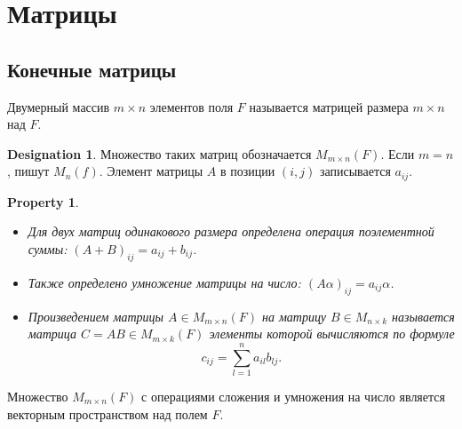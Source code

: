 \documentclass[11pt]{book}
\theoremstyle{definition}
\theoremstyle{plain}
\theoremstyle{plain}
\newtheorem*{prop}{Property}
\theoremstyle{definition}
\newtheorem*{name}{Designation}
\theoremstyle{remark}
\begin{document}
\section{Матрицы}
\subsection{Конечные матрицы}
\begin{defn}
    Двумерный массив  $ m \times n$ элементов поля $ F$ называется {\sf матрицей} размера  $ m \times  n$ над $ F$.
    \begin{name}
	Множество таких матриц  обозначается $ M_{m \times n}(F)$. Если $ m = n$, пишут  $ M_n(f)$.
	Элемент матрицы $ A$ в позиции  $ (i, j)$ записывается  $ a_{ij}$.
    \end{name}
\end{defn}
\begin{prop}
    $ $
    \begin{itemize}
	\item Для двух матриц одинакового размера определена операция поэлементной суммы: $ (A + B)_{ij} = a_{ij } + b_{ij}$.
	\item Также определено умножение матрицы на число: $ (A\alpha)_{ij } = a_{ij} \alpha$.
	\item Произведением матрицы $ A \in M_{m \times n}(F)$ на матрицу $ B \in M_{n \times k}$  называется матрица $ C = AB \in M_{m \times  k}(F)$ элементы которой вычисляются по формуле
	    \[
		c_{ij} = \sum _{l=1}^{n}a_{il}b_{lj}
	    .\]
    \end{itemize}
\end{prop}
\begin{thm}\label{prop_multi_matr}
    Множество $ M_{m \times n}(F)$ с операциями сложения и умножения на число является векторным пространством над полем $ F$.
\end{thm}
\end{document}
